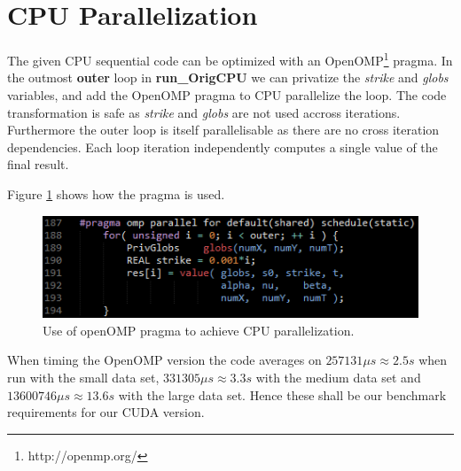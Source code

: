 \section{CPU Parallelization}
The given CPU sequential code can be optimized with an
OpenOMP\footnote{http://openmp.org/} pragma. In the outmost \textbf{outer} loop
in \textbf{run\_OrigCPU} we can privatize the \emph{strike} and \emph{globs}
variables, and add the OpenOMP pragma to CPU parallelize the loop. The code
transformation is safe as \emph{strike} and \emph{globs} are not used accross
iterations. Furthermore the outer loop is itself parallelisable as there are
no cross iteration dependencies. Each loop iteration independently computes a
single value of the final result.

Figure \ref{fig:openOMP} shows how the pragma is used.
\begin{figure}[!ht]
\centering
\includegraphics[scale=1]{input/figures/openOMPCPU.png}
\caption{Use of openOMP pragma to achieve CPU parallelization.\label{fig:openOMP}}
\end{figure}

When timing the OpenOMP version the code averages on $257131\mu s \approx 2.5s$
when run with the small data set, $331305\mu s \approx 3.3s$ with the medium
data set and $13600746\mu s \approx 13.6s$ with the large data set.
Hence these shall be our benchmark requirements for our CUDA version.
